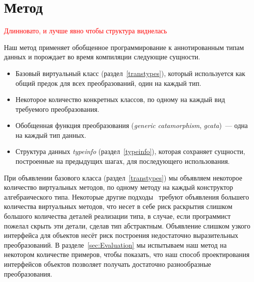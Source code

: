 \section{Метод}
\label{sec:implementation}

\textcolor{red}{Длинновато, и лучше явно чтобы структура виднелась}

Наш метод применяет обобщенное программирование к аннотированным  типам данных и порождает во время компиляции следующие сущности.

\begin{itemize}
\item Базовый виртуальный класс (раздел~\ref{transtypes}), который используется как общий предок для всех преобразований, один на каждый тип. 

\item Некоторое количество конкретных классов, по одному на каждый вид требуемого преобразования.

\item Обобщенная функция преобразования (\emph{generic catamorphism}, \emph{gcata})~--- одна на каждый тип данных.

\item Структура данных \emph{typeinfo} (раздел~\ref{typeinfo}), которая сохраняет сущности, построенные на предыдущих шагах, для последующего использования.
\end{itemize}


При объявлении базового класса (раздел~\ref{transtypes})
мы объявляем некоторое количество виртуальных методов, по одному методу на каждый конструктор алгебраического типа. Некоторые другие подходы~\cite{Visitors} требуют объявления большего количества виртуальных методов, что несет в себе риск раскрытия слишком большого количества деталей реализации типа, в случае, если программист пожелал скрыть эти детали, сделав тип абстрактным. Объявление слишком узкого интерфейса для объектов несёт риск построения недостаточно выразительных преобразований. В разделе~\ref{sec:Evaluation} мы испытываем наш метод на некотором количестве примеров, чтобы показать, что наш способ проектирования интерфейсов объектов позволяет получать достаточно разнообразные преобразования.


